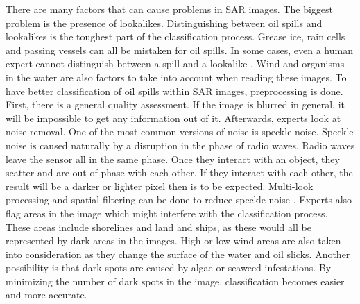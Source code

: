There are many factors that can cause problems in SAR images. The biggest problem is the presence of lookalikes. Distinguishing between oil spills and lookalikes is the toughest part of the classification process. Grease ice, rain cells and passing vessels can all be mistaken for oil spills\cite{Brekke200595}. In some cases, even a human expert cannot distinguish between a spill and a lookalike \cite{Keramitsoglou2006640}. Wind and organisms in the water are also factors to take into account when reading these images. To have better classification of oil spills within SAR images, preprocessing is done. \\
First, there is a general quality assessment. If the image is blurred in general, it will be impossible to get any information out of it. Afterwards, experts look at noise removal. One of the most common versions of noise is speckle noise. Speckle noise is caused naturally by a disruption in the phase of radio waves. Radio waves leave the sensor all in the same phase. Once they interact with an object, they scatter and are out of phase with each other. If they interact with each other, the result will be a darker or lighter pixel then is to be expected. Multi-look processing and spatial filtering can be done to reduce speckle noise \cite{simard1998analysis}. Experts also flag areas in the image which might interfere with the classification process. These areas include shorelines and land and ships, as these would all be represented by dark areas in the images.
High or low wind areas are also taken into consideration as they change the surface of the water and oil slicks. Another possibility is that dark spots are caused by algae or seaweed infestations\cite{fingas2014review}.  By minimizing the number of dark spots in the image, classification becomes easier and more accurate.
